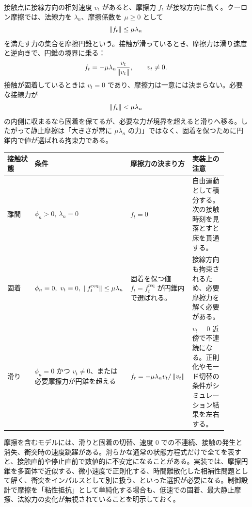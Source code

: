 接触点に接線方向の相対速度 $v_t$ があると、摩擦力 $f_t$ が接線方向に働く。クーロン摩擦では、法線力を $\lambda_n$、摩擦係数を $\mu\ge0$ として
\begin{equation}
  \left\|f_t\right\|\le\mu\lambda_n
\end{equation}
を満たす力の集合を摩擦円錐という。接触が滑っているとき、摩擦力は滑り速度と逆向きで、円錐の境界に乗る：
\begin{equation}
  f_t=-\mu\lambda_n\frac{v_t}{\left\|v_t\right\|},
  \qquad v_t\ne0.
\end{equation}
接触が固着しているときは $v_t=0$ であり、摩擦力は一意には決まらない。必要な接線力が
\begin{equation}
  \left\|f_t\right\|<\mu\lambda_n
\end{equation}
の内側に収まるなら固着を保てるが、必要な力が境界を超えると滑りへ移る。したがって静止摩擦は「大きさが常に $\mu\lambda_n$ の力」ではなく、固着を保つために円錐内で値が選ばれる拘束力である。

\begin{center}
\scriptsize
\setlength{\tabcolsep}{4pt}
\renewcommand{\arraystretch}{1.25}
\begin{tabular}{|>{\raggedright\arraybackslash}p{0.18\linewidth}|>{\raggedright\arraybackslash}p{0.28\linewidth}|>{\raggedright\arraybackslash}p{0.24\linewidth}|>{\raggedright\arraybackslash}p{0.20\linewidth}|}
\hline
接触状態 & 条件 & 摩擦力の決まり方 & 実装上の注意\\
\hline
離間 & $\phi_n>0,\ \lambda_n=0$ & $f_t=0$ & 自由運動として積分する。次の接触時刻を見落とすと床を貫通する。\\
\hline
固着 & $\phi_n=0,\ v_t=0,\ \norm{f_t^\mathrm{req}}\le\mu\lambda_n$ & 固着を保つ値 $f_t=f_t^\mathrm{req}$ が円錐内で選ばれる。 & 接線方向も拘束されるため、必要摩擦力を解く必要がある。\\
\hline
滑り & $\phi_n=0$ かつ $v_t\ne0$、または必要摩擦力が円錐を超える & $f_t=-\mu\lambda_n v_t/\left\|v_t\right\|$ & $v_t=0$ 近傍で不連続になる。正則化やモード切替の条件がシミュレーション結果を左右する。\\
\hline
\end{tabular}
\end{center}

摩擦を含むモデルには、滑りと固着の切替、速度 0 での不連続、接触の発生と消失、衝突時の速度跳躍がある。滑らかな通常の状態方程式だけで全てを表すと、接触直前や停止直前で数値的に不安定になることがある。実装では、摩擦円錐を多面体で近似する、微小速度で正則化する、時間離散化した相補性問題として解く、衝突をインパルスとして別に扱う、といった選択が必要になる。制御設計で摩擦を「粘性抵抗」として単純化する場合も、低速での固着、最大静止摩擦、法線力の変化が無視されていることを明示しておく。

